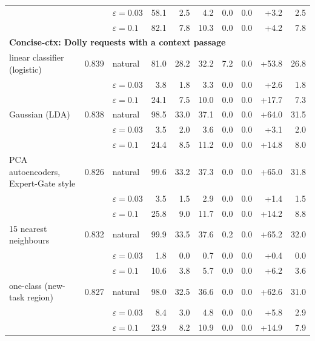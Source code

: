 \begin{table}[t]
{\begin{tabular}{l r l r r r r r r r}
 &  & $\varepsilon=0.03$ & 58.1 & 2.5 & 4.2 & 0.0 & 0.0 & +3.2 & 2.5 \\
 &  & $\varepsilon=0.1$ & 82.1 & 7.8 & 10.3 & 0.0 & 0.0 & +4.2 & 7.8 \\
\midrule
\multicolumn{10}{l}{\textbf{Concise-ctx: Dolly requests with a context passage}} \\
linear classifier (logistic) & 0.839 & natural & 81.0 & 28.2 & 32.2 & 7.2 & 0.0 & +53.8 & 26.8 \\
 &  & $\varepsilon=0.03$ & 3.8 & 1.8 & 3.3 & 0.0 & 0.0 & +2.6 & 1.8 \\
 &  & $\varepsilon=0.1$ & 24.1 & 7.5 & 10.0 & 0.0 & 0.0 & +17.7 & 7.3 \\
\midrule
Gaussian (LDA) & 0.838 & natural & 98.5 & 33.0 & 37.1 & 0.0 & 0.0 & +64.0 & 31.5 \\
 &  & $\varepsilon=0.03$ & 3.5 & 2.0 & 3.6 & 0.0 & 0.0 & +3.1 & 2.0 \\
 &  & $\varepsilon=0.1$ & 24.4 & 8.5 & 11.2 & 0.0 & 0.0 & +14.8 & 8.0 \\
\midrule
PCA autoencoders, Expert-Gate style & 0.826 & natural & 99.6 & 33.2 & 37.3 & 0.0 & 0.0 & +65.0 & 31.8 \\
 &  & $\varepsilon=0.03$ & 3.5 & 1.5 & 2.9 & 0.0 & 0.0 & +1.4 & 1.5 \\
 &  & $\varepsilon=0.1$ & 25.8 & 9.0 & 11.7 & 0.0 & 0.0 & +14.2 & 8.8 \\
\midrule
15 nearest neighbours & 0.832 & natural & 99.9 & 33.5 & 37.6 & 0.2 & 0.0 & +65.2 & 32.0 \\
 &  & $\varepsilon=0.03$ & 1.8 & 0.0 & 0.7 & 0.0 & 0.0 & +0.4 & 0.0 \\
 &  & $\varepsilon=0.1$ & 10.6 & 3.8 & 5.7 & 0.0 & 0.0 & +6.2 & 3.6 \\
\midrule
one-class (new-task region) & 0.827 & natural & 98.0 & 32.5 & 36.6 & 0.0 & 0.0 & +62.6 & 31.0 \\
 &  & $\varepsilon=0.03$ & 8.4 & 3.0 & 4.8 & 0.0 & 0.0 & +5.8 & 2.9 \\
 &  & $\varepsilon=0.1$ & 23.9 & 8.2 & 10.9 & 0.0 & 0.0 & +14.9 & 7.9 \\
\bottomrule
\end{tabular}}
\end{table}
